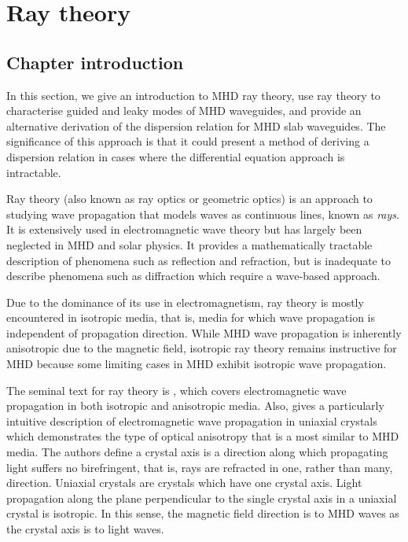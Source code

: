 
\chapter{Ray theory}
\label{chap: ray}

\section{Chapter introduction}
\label{sec: ray intro}

	In this section, we give an introduction to MHD ray theory, use ray theory to characterise guided and leaky modes of MHD waveguides, and provide an alternative derivation of the dispersion relation for MHD slab waveguides. The significance of this approach is that it could present a method of deriving a dispersion relation in cases where the differential equation approach is intractable.
	
	Ray theory (also known as ray optics or geometric optics) is an approach to studying wave propagation that models waves as continuous lines, known as \textit{rays}. It is extensively used in electromagnetic wave theory but has largely been neglected in MHD and solar physics. It provides a mathematically tractable description of phenomena such as reflection and refraction, but is inadequate to describe phenomena such as diffraction which require a wave-based approach.
	
	Due to the dominance of its use in electromagnetism, ray theory is mostly encountered in isotropic media, that is, media for which wave propagation is independent of propagation direction. While MHD wave propagation is inherently anisotropic due to the magnetic field, isotropic ray theory remains instructive for MHD because some limiting cases in MHD exhibit isotropic wave propagation.
	
	The seminal text for ray theory is \cite{bor_etal99}, which covers electromagnetic wave propagation in both isotropic and anisotropic media. Also, \cite{vei_etal10} gives a particularly intuitive description of electromagnetic wave propagation in uniaxial crystals which demonstrates the type of optical anisotropy that is a most similar to MHD media. The authors define a crystal axis is a direction along which propagating light suffers no birefringent, that is, rays are refracted in one, rather than many, direction. Uniaxial crystals are crystals which have one crystal axis. Light propagation along the plane perpendicular to the single crystal axis in a uniaxial crystal is isotropic. In this sense, the magnetic field direction is to MHD waves as the crystal axis is to light waves. 
	
